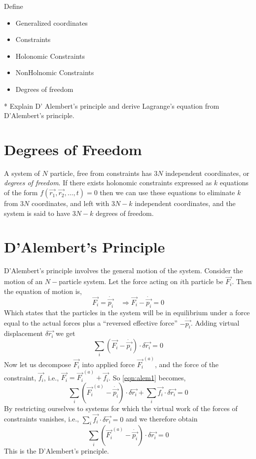 \documentclass[12pt]{article}
\begin{document}
Define
\begin{itemize}
    \item Generalized coordinates
    \item Constraints
    \item Holonomic Constraints
    \item NonHolnomic Constraints
    \item  Degrees of freedom
\end{itemize}
* Explain D' Alembert's principle and derive Lagrange's equation from D'Alembert's principle.
\section{Degrees of Freedom}
A system of \(N\) particle, free from constraints has \(3N\) independent coordinates, or \emph{degrees of freedom}. If there exists holonomic constraints expressed as \(k\) equations of the form \(f(\vec{r_1},\vec{r_2},\dots,t)=0\) then we can use these equations to eliminate \(k\) from \(3N\) coordinates, and left with \(3N-k\) independent coordinates, and the system is said to have \(3N-k\) degrees of freedom.
\section{D'Alembert's Principle}
D'Alembert's principle involves the general motion of the system. Consider the motion of an \(N-\)particle system. Let the force acting on \(i\)th particle be \(\vec{F_i}\). Then the equation of motion is,
\[
    \vec{F_i}=\dot{\vec{p_i}}\quad \Rightarrow \vec{F_i}-\dot{\vec{p_i}}=0
\]
Which states that the particles in the system will be in equilibrium under a force equal to the actual forces plus a ``reversed effective force'' \(-\dot{\vec{p_i}}\). Adding virtual displacement \(\delta \vec{r_i}\) we get
\begin{equation}
    \sum_i (\vec{F_i}-\dot{\vec{p_i}})\cdot \delta\vec{r_i}=0\label{eqn:alem1}
\end{equation}
Now let us decompose \(\vec{F_i} \) into applied force \(\vec{F_i}^{(a)}\), and the force of the constraint, \(\vec{f_i}\), i.e., \(\vec{F_i}=\vec{F_i}^{(a)}+\vec{f_i}\). So \eqref{eqn:alem1} becomes,
\[
    \sum_i (\vec{F_i}^{(a)}-\dot{\vec{p_i}})\cdot\delta\vec{r_i}+\sum_i\vec{f_i}\cdot\delta\vec{r_i}=0
\]
By restricting ourselves to systems for which the virtual work of the forces of constraints vanishes, i.e., \(\sum_i\vec{f_i}\cdot\delta\vec{r_i}=0\) and we therefore obtain
\[
    \sum_i (\vec{F_i}^{(a)}-\dot{\vec{p_i}})\cdot\delta\vec{r_i}=0
\]
This is the D'Alembert's principle.
\end{document}

